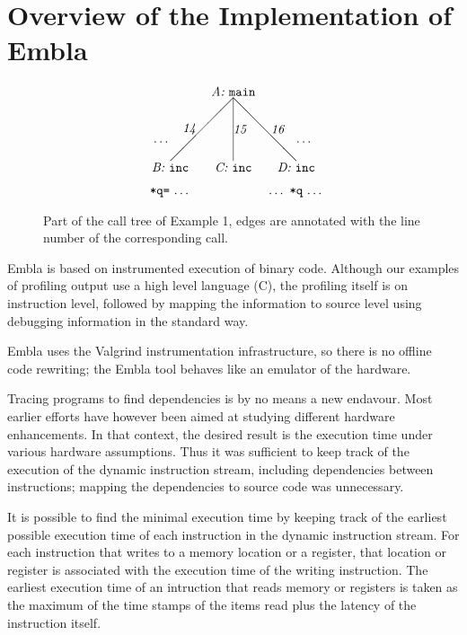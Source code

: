 \section{Overview of the Implementation of Embla}



\begin{figure} \small
\hrulefill
\[
\begin{picture}(160,90)(70,10)
\put(120,90){\makebox(60,10)[c]{\it A:\ \tt main}}
\put(150,90){\line(-1,-1){50}}
\put(150,90){\line( 0,-1){50}}
\put(150,90){\line( 1,-1){50}}
\put(100,60){\makebox(20,10)[r]{\it 14}}
\put(150,60){\makebox(20,10)[l]{\it 15}}
\put(180,60){\makebox(20,10)[l]{\it 16}}
\put(80,50){\makebox(20,10)[r]{\ldots}}
\put(200,50){\makebox(20,10)[l]{\ldots}}
\put(170,30){\makebox(60,10)[c]{\it D:\ \tt inc}}
\put(120,30){\makebox(60,10)[c]{\it C:\ \tt inc}}
\put(70,30){\makebox(60,10)[c]{\it B:\ \tt inc}}
\put(70,10){\makebox(60,10)[c]{{\tt *q=}\ \ldots}}
\put(170,10){\makebox(60,10)[c]{\ldots\ {\tt *q}\ \ldots}}
\end{picture}
\]
\hrulefill
\caption{Part of the call tree of Example 1, edges are annotated 
with the line number of the corresponding call.} 
\label{ffextree}
\end{figure}


Embla is based on instrumented execution of binary code. Although
our examples of profiling output use a high level language (C),
the profiling itself is on instruction level, followed by 
mapping the information to source level using debugging information 
in the standard way.

Embla uses the Valgrind instrumentation infrastructure, so there
is no offline code rewriting; the Embla tool behaves like an emulator
of the hardware.

Tracing programs to find dependencies is by no means a new endavour. Most 
earlier efforts have however been aimed at studying different hardware 
enhancements. In that context, the desired result is the execution time 
under various hardware assumptions. Thus it was sufficient to keep track
of the execution of the dynamic instruction stream, including dependencies
between instructions; mapping the dependencies to source code was unnecessary.

It is possible to find the minimal execution time by keeping track of the 
earliest possible execution
time of each instruction in the dynamic instruction stream. For each instruction 
that writes to a memory location or a register, that location or register is 
associated with the execution time of the writing instruction. The earliest
execution time of an intruction that reads memory or registers is taken as the
maximum of the time stamps of the items read plus the latency of the instruction 
itself.



